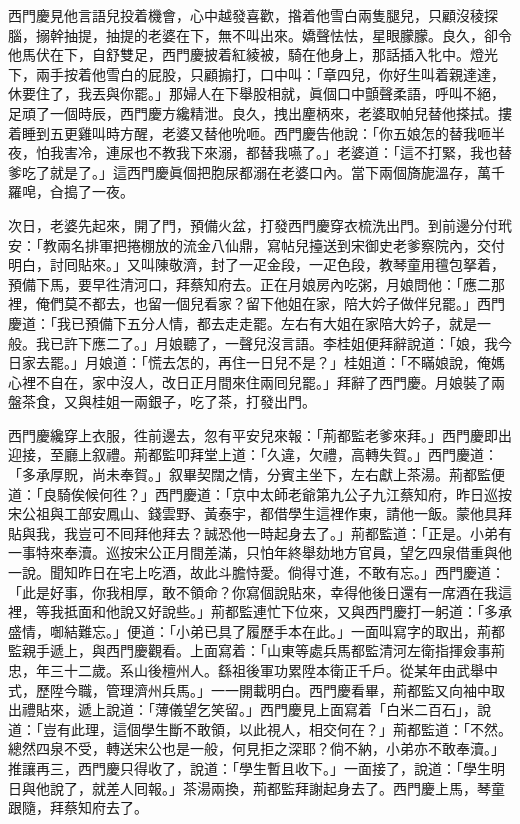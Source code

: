 西門慶見他言語兒投着機會，心中越發喜歡，揝着他雪白兩隻腿兒，{}只顧沒稜探腦，搦幹抽提，抽提的老婆在下，無不叫出來。嬌聲怯怯，星眼朦朦。良久，卻令他馬伏在下，自舒雙足，西門慶披着紅綾被，騎在他身上，那話插入牝中。燈光下，兩手按着他雪白的屁股，只顧搧打，口中叫：「章四兒，你好生叫着親達達，休要住了，我丟與你罷。」那婦人在下舉股相就，{}眞個口中顫聲柔語，呼叫不絕，足頑了一個時辰，西門慶方纔精泄。良久，拽出麈柄來，老婆取帕兒替他搽拭。摟着睡到五更雞叫時方醒，老婆又替他吮咂。西門慶告他說：「你五娘怎的替我咂半夜，怕我害冷，連尿也不教我下來溺，都替我嚥了。」{}老婆道：「這不打緊，我也替爹吃了就是了。」{}這西門慶眞個把胞尿都溺在老婆口內。{}當下兩個旖旎溫存，萬千羅唣，㒲搗了一夜。

次日，老婆先起來，開了門，預備火盆，打發西門慶穿衣梳洗出門。到前邊分付玳安：「教兩名排軍把捲棚放的流金八仙鼎，寫帖兒擡送到宋御史老爹察院內，交付明白，討囘貼來。」又叫陳敬濟，封了一疋金段，一疋色段，教琴童用氊包拏着，預備下馬，要早徃清河口，拜蔡知府去。正在月娘房內吃粥，月娘問他：「應二那裡，俺們莫不都去，也留一個兒看家？留下他姐在家，陪大妗子做伴兒罷。」西門慶道：「我已預備下五分人情，都去走走罷。左右有大姐在家陪大妗子，就是一般。我已許下應二了。」月娘聽了，一聲兒沒言語。李桂姐便拜辭說道：「娘，我今日家去罷。」月娘道：「慌去怎的，再住一日兒不是？」桂姐道：「不瞞娘說，俺媽心裡不自在，家中沒人，改日正月間來住兩囘兒罷。」拜辭了西門慶。月娘裝了兩盤茶食，又與桂姐一兩銀子，吃了茶，打發出門。

西門慶纔穿上衣服，徃前邊去，忽有平安兒來報：「荊都監老爹來拜。」西門慶即出迎接，至廳上叙禮。荊都監叩拜堂上道：「久違，欠禮，高轉失賀。」西門慶道：「多承厚貺，尚未奉賀。」叙畢契闊之情，分賓主坐下，左右獻上茶湯。荊都監便道：「良騎俟候何徃？」西門慶道：「京中太師老爺第九公子九江蔡知府，昨日巡按宋公祖與工部安鳳山、錢雲野、黃泰宇，都借學生這裡作東，請他一飯。蒙他具拜貼與我，我豈可不囘拜他拜去？誠恐他一時起身去了。」{}荊都監道：「正是。小弟有一事特來奉瀆。巡按宋公正月間差滿，只怕年終舉劾地方官員，望乞四泉借重與他一說。聞知昨日在宅上吃酒，故此斗膽恃愛。倘得寸進，不敢有忘。」西門慶道：「此是好事，你我相厚，敢不領命？你寫個說貼來，幸得他後日還有一席酒在我這裡，等我抵面和他說又好說些。」荊都監連忙下位來，又與西門慶打一躬道：「多承盛情，啣結難忘。」便道：「小弟已具了履歷手本在此。」一面叫寫字的取出，荊都監親手遞上，與西門慶觀看。上面寫着：「山東等處兵馬都監清河左衛指揮僉事荊忠，年三十二歲。系山後檀州人。繇祖後軍功累陞本衛正千戶。從某年由武舉中式，歷陞今職，管理濟州兵馬。」一一開載明白。西門慶看畢，荊都監又向袖中取出禮貼來，遞上說道：「薄儀望乞笑留。」{}西門慶見上面寫着「白米二百石」，說道：「豈有此理，這個學生斷不敢領，以此視人，相交何在？」荊都監道：「不然。總然四泉不受，轉送宋公也是一般，何見拒之深耶？倘不納，小弟亦不敢奉瀆。」推讓再三，西門慶只得收了，說道：「學生暫且收下。」一面接了，說道：「學生明日與他說了，就差人囘報。」茶湯兩換，荊都監拜謝起身去了。西門慶上馬，琴童跟隨，拜蔡知府去了。

